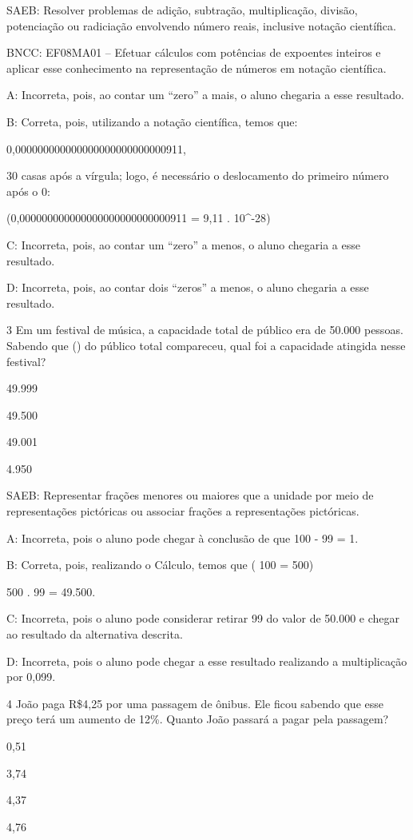 {SAEB: Resolver problemas de adição, subtração, multiplicação, divisão,
potenciação ou radiciação envolvendo número reais, inclusive notação
científica.

BNCC: EF08MA01 -- Efetuar cálculos com potências de expoentes inteiros e
aplicar esse conhecimento na representação de números em notação
científica.

A: Incorreta, pois, ao contar um ``zero'' a mais, o aluno chegaria a
esse resultado.

B: Correta, pois, utilizando a notação científica, temos que:

0,000000000000000000000000000911,

30 casas após a vírgula; logo, é necessário o deslocamento do primeiro
número após o 0:

(0,000000000000000000000000000911 = 9,11 . 10^{-28})

C: Incorreta, pois, ao contar um ``zero'' a menos, o aluno chegaria a
esse resultado.

D: Incorreta, pois, ao contar dois ``zeros'' a menos, o aluno chegaria a
esse resultado.

\num{3} Em um festival de música, a capacidade total de público era de 50.000
pessoas. Sabendo que () do público total compareceu,
qual foi a capacidade atingida nesse festival?
\item 49.999
\item 49.500
\item 49.001
\item 4.950

SAEB: Representar frações menores ou maiores que a unidade por meio de
representações pictóricas ou associar frações a representações
pictóricas.

A: Incorreta, pois o aluno pode chegar à conclusão de que 100 - 99 = 1.

B: Correta, pois, realizando o Cálculo, temos que
(  {100} = 500)

500 . 99 = 49.500.

C: Incorreta, pois o aluno pode considerar retirar 99 do valor de 50.000
e chegar ao resultado da alternativa descrita.

D: Incorreta, pois o aluno pode chegar a esse resultado realizando a
multiplicação por 0,099.

\num{4} João paga R\$4,25 por uma passagem de ônibus. Ele ficou sabendo que
esse preço terá um aumento de 12\%. Quanto João passará a pagar pela
passagem?
\item 0,51
\item 3,74
\item 4,37
\item 4,76

}
